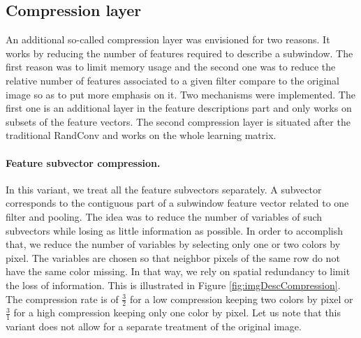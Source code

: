 \documentclass[a4paper]{report}
\begin{document}
		\subsection{Compression layer}
		An additional so-called compression layer was envisioned for two reasons. It works by reducing the number of features required to describe a subwindow. The first reason was to limit memory usage and the second one was to reduce the relative number of features associated to a given filter compare to the original image so as to put more emphasis on it.
		Two mechanisms were implemented. The first one is an additional layer in the feature descriptions part and only works on subsets of the  feature vectors. The second compression layer is situated after the traditional RandConv and works on the whole learning matrix.
		
		\paragraph{Feature subvector compression.}
		In this variant, we treat all the feature subvectors separately. A subvector corresponds to the contiguous part of a subwindow feature vector related to one filter and pooling. The idea was to reduce the number of variables of such subvectors while losing as little information as possible. In order to accomplish that, we reduce the number of variables by selecting only one or two colors by pixel. The variables are chosen so that neighbor pixels of the same row do not have the same color missing. In that way, we rely on spatial redundancy to limit the loss of information. This is illustrated in Figure \ref{fig:imgDescCompression}. The compression rate is of $\frac{3}{2}$ for a low compression keeping two colors by pixel or $\frac{3}{1}$ for a high compression keeping only one color by pixel.
		Let us note that this variant does not allow for a separate treatment of the original image.
		
\end{document}
